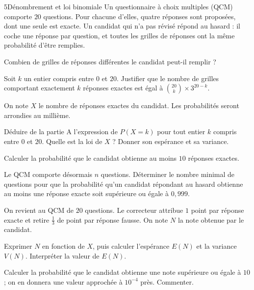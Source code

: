 

\begin{exoBac}{5}{Dénombrement et loi binomiale}
Un questionnaire à choix multiples (QCM) comporte $20$ questions. Pour chacune d'elles, quatre réponses sont proposées, dont une seule
est exacte. Un candidat qui n'a pas révisé répond au hasard : il coche une réponse par question, et toutes les grilles de réponses
ont la même probabilité d'être remplies.
\begin{questions}
  \item Combien de grilles de réponses différentes le candidat peut-il remplir ?
  \item Soit $k$ un entier compris entre $0$ et $20$. Justifier que le nombre de grilles comportant exactement $k$ réponses exactes est
    égal à $\binom{20}{k}\times3^{20-k}$.
\end{questions}
On note $X$ le nombre de réponses exactes du candidat. Les probabilités seront arrondies au millième.
\begin{questions}[resume]
  \item Déduire de la partie A l'expression de $P(X=k)$ pour tout entier $k$ compris entre $0$ et $20$. Quelle est la loi de $X$ ?
    Donner son espérance et sa variance.
  \item Calculer la probabilité que le candidat obtienne au moins $10$ réponses exactes.
  \item Le QCM comporte désormais $n$ questions. Déterminer le nombre minimal de questions pour que la probabilité qu'un candidat
    répondant au hasard obtienne au moins une réponse exacte soit supérieure ou égale à $0{,}999$.
\end{questions}
On revient au QCM de $20$ questions. Le correcteur attribue $1$ point par réponse exacte et retire $\frac13$ de point par réponse
fausse. On note $N$ la note obtenue par le candidat.
\begin{questions}[resume]
  \item Exprimer $N$ en fonction de $X$, puis calculer l'espérance $E(N)$ et la variance $V(N)$. Interpréter la valeur de $E(N)$.
  \item Calculer la probabilité que le candidat obtienne une note supérieure ou égale à $10$ ; on en donnera une valeur approchée à
    $10^{-4}$ près. Commenter.
\end{questions}
\end{exoBac}

